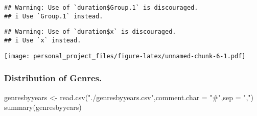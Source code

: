 \documentclass[
]{article}
\newenvironment{Shaded}{\begin{snugshade}}{\end{snugshade}}
\newcommand{\AttributeTok}[1]{\textcolor[rgb]{0.77,0.63,0.00}{#1}}
\newcommand{\ControlFlowTok}[1]{\textcolor[rgb]{0.13,0.29,0.53}{\textbf{#1}}}
\newcommand{\FloatTok}[1]{\textcolor[rgb]{0.00,0.00,0.81}{#1}}
\newcommand{\FunctionTok}[1]{\textcolor[rgb]{0.00,0.00,0.00}{#1}}
\newcommand{\NormalTok}[1]{#1}
\newcommand{\OtherTok}[1]{\textcolor[rgb]{0.56,0.35,0.01}{#1}}
\newcommand{\SpecialCharTok}[1]{\textcolor[rgb]{0.00,0.00,0.00}{#1}}
\newcommand{\StringTok}[1]{\textcolor[rgb]{0.31,0.60,0.02}{#1}}
\begin{document}
\begin{Shaded}
\end{Shaded}

\begin{verbatim}
## Warning: Use of `duration$Group.1` is discouraged.
## i Use `Group.1` instead.
\end{verbatim}

\begin{verbatim}
## Warning: Use of `duration$x` is discouraged.
## i Use `x` instead.
\end{verbatim}

\texttt{[image: personal\_project\_files/figure-latex/unnamed-chunk-6-1.pdf]}

\hypertarget{distribution-of-genres.}{%
\subsubsection{Distribution of Genres.}\label{distribution-of-genres.}}

\begin{Shaded}
\begin{Highlighting}[]
\NormalTok{genresbyyears }\OtherTok{\textless{}{-}} \FunctionTok{read.csv}\NormalTok{(}\StringTok{"./genresbyyears.csv"}\NormalTok{,}\AttributeTok{comment.char =} \StringTok{"\#"}\NormalTok{,}\AttributeTok{sep =} \StringTok{","}\NormalTok{)}
\FunctionTok{summary}\NormalTok{(genresbyyears)}
\end{Highlighting}
\end{Shaded}
\end{document}

